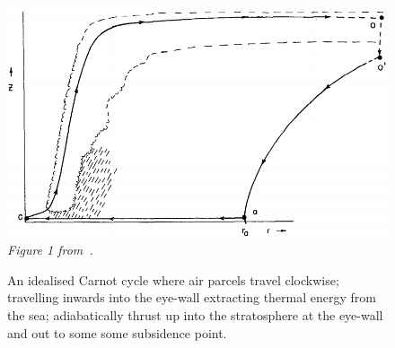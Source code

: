 \begin{figure}
\centering
    \includegraphics[width=\linewidth]{images/hurricane-carnot.png}\\
    \textit{Figure 1 from~\cite{emanuel1991theory}. }
    \caption{An idealised Carnot cycle where air parcels travel clockwise;
            travelling inwards into the eye-wall extracting thermal energy
            from the sea; adiabatically thrust up into the stratosphere
            at the eye-wall and out to some some subsidence point. }
            \label{fig:hurricane-carnot}

\end{figure}
